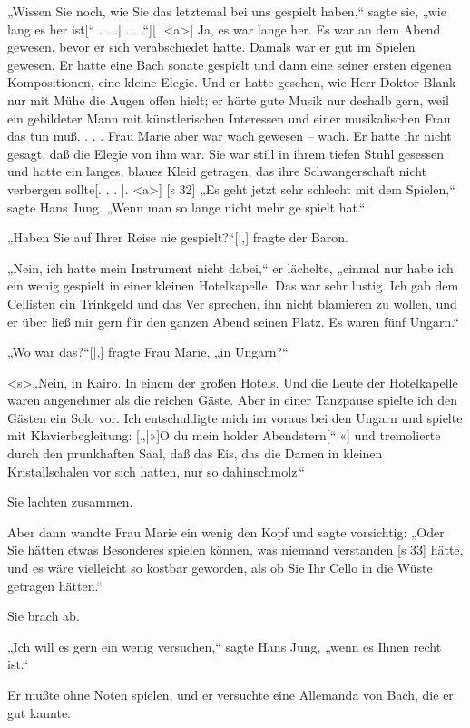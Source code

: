 „Wissen Sie noch, wie Sie das letztemal bei
uns gespielt haben,“ sagte sie, „wie lang es her ist[“ . . .| . . .“][
|<a>]
Ja, es war lange her. Es war an dem Abend
gewesen, bevor er sich verabschiedet hatte. Damals
war er gut im Spielen gewesen. Er hatte eine Bach­
sonate gespielt und dann eine seiner ersten eigenen
Kompositionen, eine kleine Elegie. Und er hatte
gesehen, wie Herr Doktor Blank nur mit Mühe die
Augen offen hielt; er hörte gute Musik nur deshalb
gern, weil ein gebildeter Mann mit künstlerischen
Interessen und einer musikalischen Frau das tun
muß. . . . Frau Marie aber war wach gewesen –
wach. Er hatte ihr nicht gesagt, daß die Elegie von
ihm war. Sie war still in ihrem tiefen Stuhl gesessen
und hatte ein langes, blaues Kleid getragen, das
ihre Schwangerschaft nicht verbergen sollte[. . .
|.
<a>]
[s 32]
„Es geht jetzt sehr schlecht mit dem Spielen,“ sagte
Hans Jung. „Wenn man so lange nicht mehr ge­
spielt hat.“

„Haben Sie auf Ihrer Reise nie gespielt?“[|,] fragte
der Baron.

„Nein, ich hatte mein Instrument nicht dabei,“
er lächelte, „einmal nur habe ich ein wenig gespielt
in einer kleinen Hotelkapelle. Das war sehr lustig.
Ich gab dem Cellisten ein Trinkgeld und das Ver­
sprechen, ihn nicht blamieren zu wollen, und er über­
ließ mir gern für den ganzen Abend seinen Platz.
Es waren fünf Ungarn.“

„Wo war das?“[|,] fragte Frau Marie, „in Ungarn?“

<s>„Nein, in Kairo. In einem der großen Hotels.
Und die Leute der Hotelkapelle waren angenehmer
als die reichen Gäste. Aber in einer Tanzpause
spielte ich den Gästen ein Solo vor. Ich entschuldigte
mich im voraus bei den Ungarn und spielte mit
Klavierbegleitung: [„|»]O du mein holder Abendstern[“|«]
und tremolierte durch den prunkhaften Saal, daß das
Eis, das die Damen in kleinen Kristallschalen vor
sich hatten, nur so dahinschmolz.“

Sie lachten zusammen.

Aber dann wandte Frau Marie ein wenig den
Kopf und sagte vorsichtig: „Oder Sie hätten etwas
Besonderes spielen können, was niemand verstanden
[s 33]
hätte, und es wäre vielleicht so kostbar geworden,
als ob Sie Ihr Cello in die Wüste getragen hätten.“

Sie brach ab.

„Ich will es gern ein wenig versuchen,“ sagte
Hans Jung, „wenn es Ihnen recht ist.“

Er mußte ohne Noten spielen, und er versuchte
eine Allemanda von Bach, die er gut kannte.

